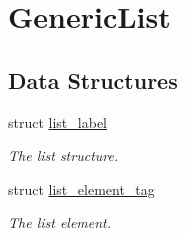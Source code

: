 \hypertarget{group___generic_list}{}\section{Generic\+List}
\label{group___generic_list}
\subsection*{Data Structures}
\begin{DoxyCompactItemize}
\item 
struct \mbox{\hyperlink{structlist__label}{list\+\_\+label}}
\begin{DoxyCompactList}\small\item\em The list structure. \end{DoxyCompactList}\item 
struct \mbox{\hyperlink{structlist__element__tag}{list\+\_\+element\+\_\+tag}}
\begin{DoxyCompactList}\small\item\em The list element. \end{DoxyCompactList}\end{DoxyCompactItemize}

